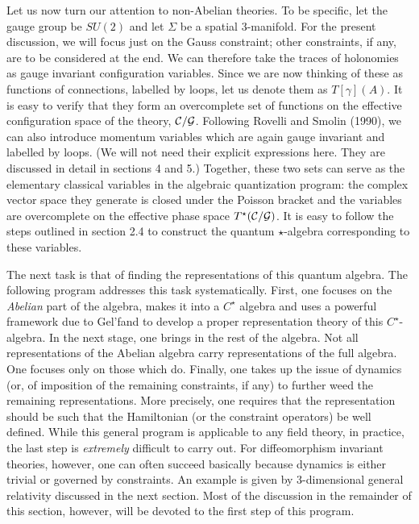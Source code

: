 Let us now turn our attention to non-Abelian theories. To be specific, let
the gauge group be $SU(2)$ and let $\Sigma$ be a spatial 3-manifold. For
the present discussion, we will focus just on the Gauss constraint; other
constraints, if any, are to be considered at the end. We can therefore
take the traces of holonomies as gauge invariant configuration variables.
Since we are now thinking of these as functions of connections, labelled by
loops, let us denote them as $T[\gamma](A)$. It is easy to verify that they
form an overcomplete set of functions on the effective configuration space of
the theory, ${\cal C}/{\cal G}$. Following Rovelli and Smolin (1990), we can
also introduce momentum variables which are again gauge invariant and labelled
by loops. (We will not need their explicit expressions here. They are
discussed in detail in sections 4 and 5.) Together, these two sets can serve
as the elementary classical variables in the algebraic quantization program:
the complex vector space they generate is closed under the Poisson bracket and
the variables are overcomplete on the effective phase space $T^\star({\cal C}
/{\cal G})$. It is easy to follow the steps outlined in section 2.4 to
construct the quantum $\star$-algebra corresponding to these variables.

The next task is that of finding the representations of this quantum algebra.
The following program addresses this task systematically. First, one focuses
on the {\it Abelian} part of the algebra, makes it into a $C^\star$ algebra
and uses a powerful framework due to Gel'fand to develop a proper
representation theory of this $C^\star$-algebra. In the next stage, one
brings in the rest of the algebra. Not all representations of the Abelian
algebra carry representations of the full algebra. One focuses only on
those which do. Finally, one takes up the issue of dynamics (or, of
imposition of the remaining constraints, if any) to further weed the remaining
representations. More precisely, one requires that the representation should
be such that the Hamiltonian (or the constraint operators) be well defined.
While this general program is applicable to any field theory, in practice,
the last step is {\it extremely} difficult to carry out. For diffeomorphism
invariant theories, however, one can often succeed basically because dynamics
is either trivial or governed by constraints. An example is given by
3-dimensional general relativity discussed in the next section. Most of the
discussion in the remainder of this section, however, will be devoted to the
first step of this program.

